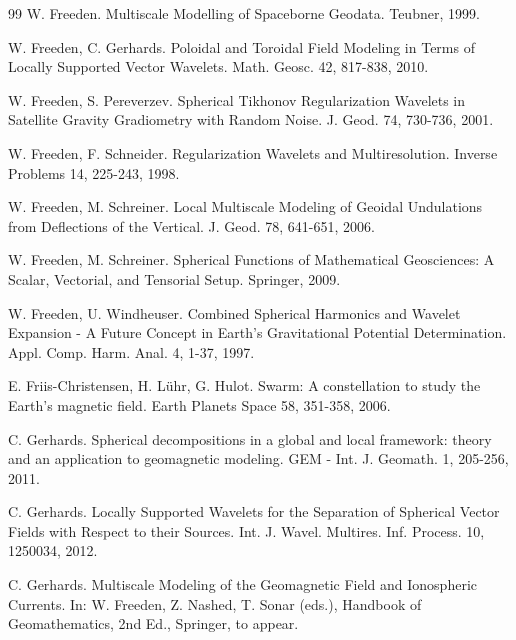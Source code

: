 \documentclass[a4paper, 10pt]{article}
\numberwithin{equation}{section}
\theoremstyle{definition}
\begin{document}
\begin{thebibliography}{99}
W. Freeden. Multiscale Modelling of Spaceborne Geodata. Teubner, 1999.

W. Freeden, C. Gerhards. Poloidal and Toroidal Field Modeling in Terms of Locally Supported Vector Wavelets. Math. Geosc. 42, 817-838, 2010.


W. Freeden, S. Pereverzev. Spherical Tikhonov Regularization Wavelets in Satellite Gravity Gradiometry with Random Noise. J. Geod. 74, 730-736, 2001.

W. Freeden, F. Schneider. Regularization Wavelets and Multiresolution. Inverse Problems 14, 225-243, 1998.

W. Freeden, M. Schreiner. Local Multiscale Modeling of Geoidal Undulations from Deflections of the Vertical. J. Geod. 78, 641-651, 2006. 

W. Freeden, M. Schreiner. Spherical Functions of Mathematical Geosciences: A Scalar, Vectorial, and Tensorial Setup. Springer, 2009.

W. Freeden, U. Windheuser. Combined Spherical Harmonics and Wavelet Expansion - A Future Concept in Earth's Gravitational Potential Determination. Appl. Comp. Harm. Anal. 4, 1-37, 1997.


E. Friis-Christensen, H. L\"uhr, G. Hulot. Swarm: A constellation to study the Earth's magnetic field. Earth Planets Space 58, 351-358, 2006.

C. Gerhards. Spherical decompositions in a global and local framework: theory and an application to geomagnetic modeling. GEM - Int. J. Geomath. 1, 205-256, 2011.

C. Gerhards. Locally Supported Wavelets for the Separation of Spherical Vector Fields with Respect to their Sources. Int. J. Wavel. Multires. Inf. Process. 10, 1250034, 2012.

C. Gerhards. Multiscale Modeling of the Geomagnetic Field and Ionospheric Currents. In: W. Freeden, Z. Nashed, T. Sonar (eds.), Handbook of Geomathematics, 2nd Ed., Springer, to appear.


\end{thebibliography}
\end{document}
